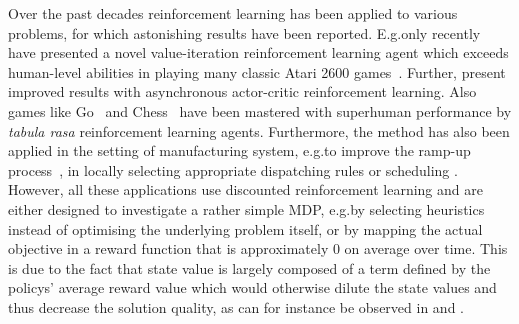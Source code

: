 \documentclass[envcountsame]{llncs}
\begin{document}
Over the past decades reinforcement learning has been applied to various problems, for which
astonishing results have been reported. E.g.\@ only recently \citet{mnih2015human} have presented a
novel value-iteration reinforcement learning agent which exceeds human-level abilities in playing
many classic Atari 2600 games~\citep{bellemare2012investigating}. Further,
\citet{mnih2016asynchronous} present improved results with asynchronous actor-critic reinforcement
learning. Also games like Go~\citep{silver2016mastering} and Chess~\citep{silver2017mastering} have
been mastered with superhuman performance by \textit{tabula rasa} reinforcement learning agents.
Furthermore, the method has also been applied in the setting of manufacturing system, e.g.\@ to
improve the ramp-up process~\citep{doltsinis2012reinforcement}, in locally selecting appropriate
dispatching rules \citep{zhang1995reinforcement,wang2005application} or scheduling
\citep{zhang1995reinforcement, waschneck2018optimization}.
%
However, all these applications use discounted reinforcement learning and are either designed to
investigate a rather simple MDP, e.g.\@ by selecting heuristics instead of optimising the underlying
problem itself, or by mapping the actual objective in a reward function that is approximately \(0\)
on average over time.
%
This is due to the fact that state value is largely composed of a term defined by the policys'
average reward value \citep{MillerVeinott1969,Blackwell62} which would otherwise dilute the state
values and thus decrease the solution quality, as can for instance be observed in
\citet{SchneckenreitherHaeussler2019} and \citet{gijsbrechts2018can}.
%
\end{document}
